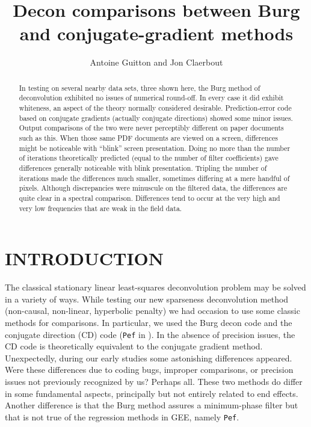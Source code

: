 \title{Decon comparisons between Burg and conjugate-gradient methods}
\author{Antoine Guitton and Jon Claerbout}
\maketitle

\begin{abstract}
In testing on several nearby data sets, three shown here,
the Burg method of deconvolution exhibited no issues of numerical round-off.
In every case it did exhibit whiteness, an aspect of the theory normally considered desirable.
Prediction-error code based on conjugate gradients
(actually conjugate directions) showed some minor issues.
Output comparisons of the two were never perceptibly different on paper documents such as this.
When those same PDF documents are viewed on a screen,
differences might be noticeable with ``blink'' screen presentation.
Doing no more than the number of iterations theoretically predicted
(equal to the number of filter coefficients)
gave differences generally noticeable with blink presentation.
Tripling the number of iterations made the differences
much smaller, sometimes differing at a mere handful of pixels.
Although discrepancies were minuscule on the filtered data,
the differences are quite clear in a spectral comparison.
Differences tend to occur at the very high and very low frequencies that are weak in the field data.
\end{abstract}

\section{INTRODUCTION}

The classical stationary linear least-squares deconvolution problem may be solved in a variety of ways.
While testing our new sparseness deconvolution method
(non-causal, non-linear, hyperbolic penalty)
we had occasion to use some classic methods for comparisons.
In particular,
we used the Burg decon code \citep{FGDP}
and the conjugate direction (CD) code
(\texttt{Pef} in \cite{GEE}).
In the absence of precision issues, the CD code is theoretically equivalent to the conjugate gradient method.
Unexpectedly,
during our early studies some astonishing differences appeared.
Were these differences due to coding bugs,
improper comparisons,
or precision issues not previously recognized by us?
Perhaps all.
These two methods do differ in some fundamental aspects,
principally but not entirely related to end effects.
Another difference is that the Burg method assures a minimum-phase filter
but that is not true of the regression methods in GEE, namely
\texttt{Pef}.

